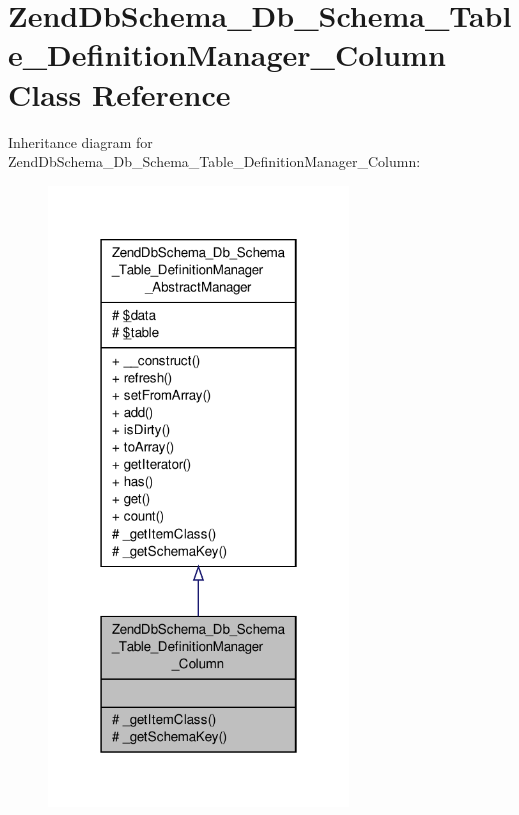 \hypertarget{classZendDbSchema__Db__Schema__Table__DefinitionManager__Column}{\section{Zend\-Db\-Schema\-\_\-\-Db\-\_\-\-Schema\-\_\-\-Table\-\_\-\-Definition\-Manager\-\_\-\-Column Class Reference}
\label{classZendDbSchema__Db__Schema__Table__DefinitionManager__Column}
}


Inheritance diagram for Zend\-Db\-Schema\-\_\-\-Db\-\_\-\-Schema\-\_\-\-Table\-\_\-\-Definition\-Manager\-\_\-\-Column\-:\nopagebreak
\begin{figure}[H]
\begin{center}
\leavevmode
\includegraphics[width=226pt]{classZendDbSchema__Db__Schema__Table__DefinitionManager__Column__inherit__graph}
\end{center}
\end{figure}


